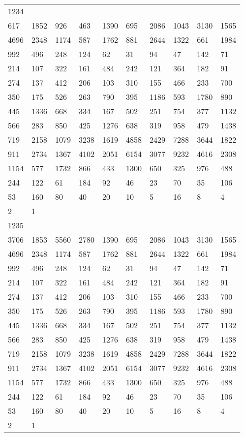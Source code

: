 \begin{longtable}{*{10}{l}}
1234&&&&&&&&&\\
617& 1852& 926& 463& 1390& 695& 2086& 1043& 3130& 1565\\
4696& 2348& 1174& 587& 1762& 881& 2644& 1322& 661& 1984\\
992& 496& 248& 124& 62& 31& 94& 47& 142& 71\\
214& 107& 322& 161& 484& 242& 121& 364& 182& 91\\
274& 137& 412& 206& 103& 310& 155& 466& 233& 700\\
350& 175& 526& 263& 790& 395& 1186& 593& 1780& 890\\
445& 1336& 668& 334& 167& 502& 251& 754& 377& 1132\\
566& 283& 850& 425& 1276& 638& 319& 958& 479& 1438\\
719& 2158& 1079& 3238& 1619& 4858& 2429& 7288& 3644& 1822\\
911& 2734& 1367& 4102& 2051& 6154& 3077& 9232& 4616& 2308\\
1154& 577& 1732& 866& 433& 1300& 650& 325& 976& 488\\
244& 122& 61& 184& 92& 46& 23& 70& 35& 106\\
53& 160& 80& 40& 20& 10& 5& 16& 8& 4\\
2& 1& \\

1235&&&&&&&&&\\
3706& 1853& 5560& 2780& 1390& 695& 2086& 1043& 3130& 1565\\
4696& 2348& 1174& 587& 1762& 881& 2644& 1322& 661& 1984\\
992& 496& 248& 124& 62& 31& 94& 47& 142& 71\\
214& 107& 322& 161& 484& 242& 121& 364& 182& 91\\
274& 137& 412& 206& 103& 310& 155& 466& 233& 700\\
350& 175& 526& 263& 790& 395& 1186& 593& 1780& 890\\
445& 1336& 668& 334& 167& 502& 251& 754& 377& 1132\\
566& 283& 850& 425& 1276& 638& 319& 958& 479& 1438\\
719& 2158& 1079& 3238& 1619& 4858& 2429& 7288& 3644& 1822\\
911& 2734& 1367& 4102& 2051& 6154& 3077& 9232& 4616& 2308\\
1154& 577& 1732& 866& 433& 1300& 650& 325& 976& 488\\
244& 122& 61& 184& 92& 46& 23& 70& 35& 106\\
53& 160& 80& 40& 20& 10& 5& 16& 8& 4\\
2& 1& \\


\end{longtable}
